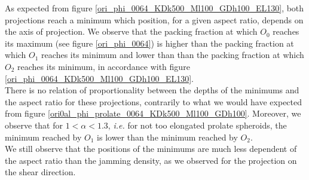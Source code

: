 \documentclass[class=report, float=false, crop=false]{standalone}
\begin{document}
As expected from figure \ref{ori_phi_0064_KDk500_Ml100_GDh100_EL130}, both projections reach a minimum which position, for a given aspect ratio, depends on the axis of projection. We observe that the packing fraction at which $O_0$ reaches its maximum (see figure \ref{ori_phi_0064}) is higher than the packing fraction at which $O_1$ reaches its minimum and lower than than the packing fraction at which $O_2$ reaches its minimum, in accordance with figure \ref{ori_phi_0064_KDk500_Ml100_GDh100_EL130}.\\

There is no relation of proportionality between the depths of the minimums and the aspect ratio for these projections, contrarily to what we would have expected from figure \ref{ori0al_phi_prolate_0064_KDk500_Ml100_GDh100}. Moreover, we observe that for $1<\alpha<1.3$, \textit{i.e.} for not too elongated prolate spheroids, the minimum reached by $O_1$ is lower than the minimum reached by $O_2$.\\

We still observe that the positions of the minimums are much less dependent of the aspect ratio than the jamming density, as we observed for the projection on the shear direction.

\end{document}
